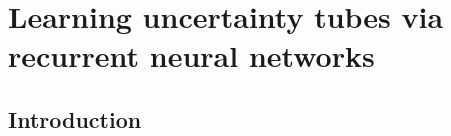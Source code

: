 \chapter{Learning uncertainty tubes via recurrent neural networks} \label{chap:NN}

\section{Introduction}






